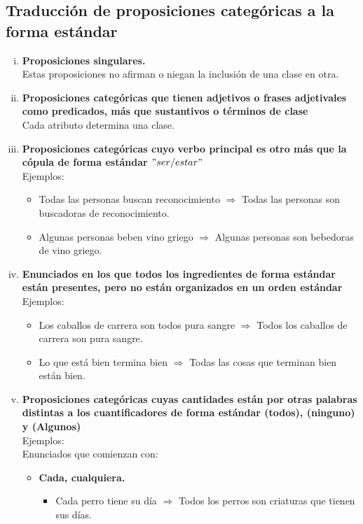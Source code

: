 \documentclass[10pt]{book} 						%
\begin{document}
\subsection{Traducción de proposiciones categóricas a la forma estándar}
\begin{enumerate}[i)]
\item \textbf{Proposiciones singulares.}\\
Estas proposiciones no afirman o niegan la inclusión de una clase en otra.
\item \textbf{Proposiciones categóricas que tienen adjetivos o frases adjetivales como predicados, más que sustantivos o términos de clase}\\
Cada atributo determina una clase.
\item \textbf{Proposiciones categóricas cuyo verbo principal es otro más que la cópula de forma estándar $"ser/estar"$}\\
Ejemplos:
\begin{itemize}
\item Todas las personas buscan reconocimiento $\Rightarrow$ Todas las personas son buscadoras de reconocimiento.
\item Algunas personas beben vino griego $\Rightarrow$ Algunas personas son bebedoras de vino griego.
\end{itemize}
\item \textbf{Enunciados en los que todos los ingredientes de forma estándar están presentes, pero no están organizados en un orden estándar}\\
Ejemplos:
\begin{itemize}
\item Los caballos de carrera son todos pura sangre $\Rightarrow$ Todos los caballos de carrera son pura sangre.
\item Lo que está bien termina bien $\Rightarrow $ Todas las cosas que terminan bien están bien.
\end{itemize}
\item \textbf{Proposiciones categóricas cuyas cantidades están por otras palabras distintas a los cuantificadores de forma estándar (todos), (ninguno) y (Algunos)}\\
Ejemplos:\\
Enunciados que comienzan con:
\begin{itemize}
\item \textbf{Cada, cualquiera.}
\begin{itemize}
\item Cada perro tiene su día $\Rightarrow$ Todos los perros son criaturas que tienen sus días. 

\end{itemize}
\end{itemize}
\end{enumerate}
\end{document}
